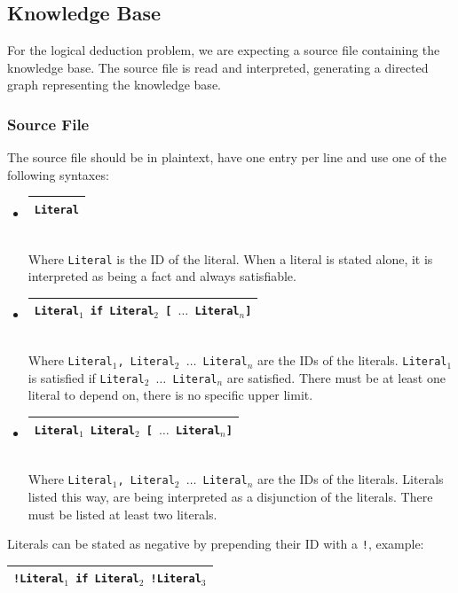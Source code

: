 \documentclass[11pt]{article}
\newcommand{\tbox}[1] {\begin{tabular}{| c |}\hline {#1} \\ \hline\end{tabular}}
\begin{document}
\subsection{Knowledge Base}
For the logical deduction problem, we are expecting a source file containing the knowledge base. The source file is read and interpreted, generating a directed graph representing the knowledge base.

\subsubsection{Source File}
The source file should be in plaintext, have one entry per line and use one of the following syntaxes:
\begin{itemize}
	\item \tbox{\tt Literal}\\
	Where {\tt Literal} is the ID of the literal. When a literal is stated alone, it is interpreted as being a fact and always satisfiable.
	
	\item \tbox{\tt Literal$_1$ if Literal$_2$ [ $\ldots$ Literal$_n$]}\\
	Where {\tt Literal$_1$, Literal$_2$ $\ldots$ Literal$_n$} are the IDs of the literals. {\tt Literal$_1$} is satisfied if {\tt Literal$_2$ $\ldots$ Literal$_n$} are satisfied. There must be at least one literal to depend on, there is no specific upper limit.
	
	\item \tbox{\tt Literal$_1$ Literal$_2$  [ $\ldots$ Literal$_n$]}\\
	Where {\tt Literal$_1$, Literal$_2$ $\ldots$ Literal$_n$} are the IDs of the literals. Literals listed this way, are being interpreted as a disjunction of the literals. There must be listed at least two literals.
\end{itemize}

Literals can be stated as negative by prepending their ID with a {\tt !}, example:\\ \tbox{\tt !Literal$_1$ if Literal$_2$ !Literal$_3$}
\end{document}
